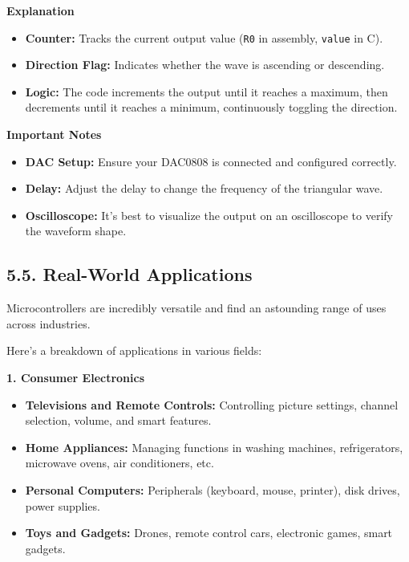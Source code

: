 \documentclass[
]{article}
\begin{document}
\textbf{Explanation}

\begin{itemize}
\item
  \textbf{Counter:} Tracks the current output value (\texttt{R0} in
  assembly, \texttt{value} in C).
\item
  \textbf{Direction Flag:} Indicates whether the wave is ascending or
  descending.
\item
  \textbf{Logic:} The code increments the output until it reaches a
  maximum, then decrements until it reaches a minimum, continuously
  toggling the direction.
\end{itemize}

\textbf{Important Notes}

\begin{itemize}
\item
  \textbf{DAC Setup:} Ensure your DAC0808 is connected and configured
  correctly.
\item
  \textbf{Delay:} Adjust the delay to change the frequency of the
  triangular wave.
\item
  \textbf{Oscilloscope:} It's best to visualize the output on an
  oscilloscope to verify the waveform shape.
\end{itemize}

\hypertarget{55-real-world-applications}{%
\subsection{5.5. Real-World
Applications}\label{55-real-world-applications}}

Microcontrollers are incredibly versatile and find an astounding range
of uses across industries.

Here's a breakdown of applications in various fields:

\textbf{1. Consumer Electronics}

\begin{itemize}
\item
  \textbf{Televisions and Remote Controls:} Controlling picture
  settings, channel selection, volume, and smart features.
\item
  \textbf{Home Appliances:} Managing functions in washing machines,
  refrigerators, microwave ovens, air conditioners, etc.
\item
  \textbf{Personal Computers:} Peripherals (keyboard, mouse, printer),
  disk drives, power supplies.
\item
  \textbf{Toys and Gadgets:} Drones, remote control cars, electronic
  games, smart gadgets.
\end{itemize}
\end{document}
